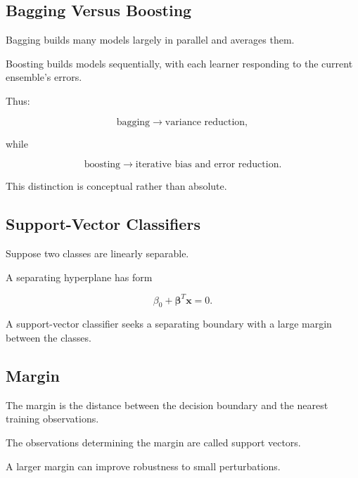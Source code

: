 \subsection{Bagging Versus Boosting}
\label{subsec:bagging-versus-boosting}

Bagging builds many models largely in parallel and averages them.

Boosting builds models sequentially, with each learner responding to the
current ensemble's errors.

Thus:

\[
\boxed{
\text{bagging}
\rightarrow
\text{variance reduction},
}
\]

while

\[
\boxed{
\text{boosting}
\rightarrow
\text{iterative bias and error reduction}.
}
\]

This distinction is conceptual rather than absolute.

\subsection{Support-Vector Classifiers}
\label{subsec:support-vector-classifiers}

Suppose two classes are linearly separable.

A separating hyperplane has form

\[
\boxed{
\beta_0
+
\boldsymbol{\beta}^T
\mathbf{x}
=
0.
}
\]

A support-vector classifier seeks a separating boundary with a large
margin between the classes.

\subsection{Margin}
\label{subsec:svm-margin}

The margin is the distance between the decision boundary and the nearest
training observations.

The observations determining the margin are called support vectors.

A larger margin can improve robustness to small perturbations.

